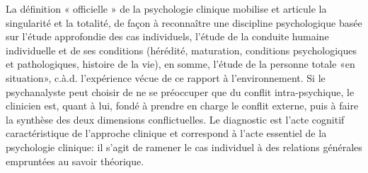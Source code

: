 La définition « officielle » de la psychologie clinique mobilise et articule la singularité et
la totalité, de façon à reconnaître une discipline psychologique basée sur l’étude approfondie des cas individuels, l’étude de la conduite humaine individuelle et de ses conditions (hérédité, maturation, conditions psychologiques et pathologiques, histoire de la vie), en somme, l’étude de la personne totale «en situation», c.à.d. l’expérience vécue de ce rapport à l’environnement.
Si le psychanalyste peut choisir de ne se préoccuper que du conflit intra-psychique, le clinicien est, quant à lui, fondé à prendre en charge le conflit externe, puis à faire la synthèse des deux dimensions conflictuelles.
Le diagnostic est l’acte cognitif caractéristique de l’approche clinique et correspond à l’acte essentiel de la psychologie clinique: il s’agit de ramener le cas individuel à des relations générales empruntées au savoir théorique.




